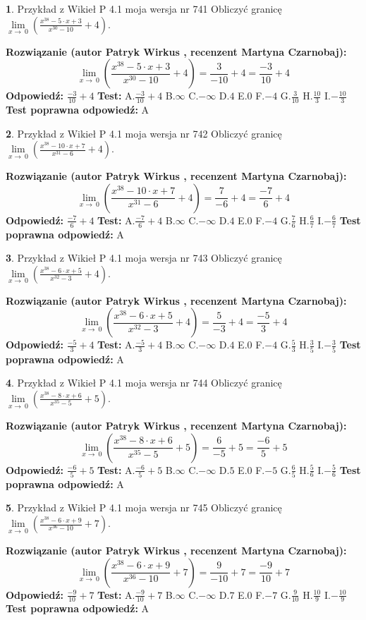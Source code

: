 \documentclass[12pt, a4paper]{article}
\theoremstyle{definition} %
\newtheorem{zad}{}
\newcommand{\zadStart}[1]{\begin{zad}#1\newline}
\newcommand{\zadStop}{\end{zad}}
\newcommand{\rozwStart}[2]{\noindent \textbf{Rozwiązanie (autor #1 , recenzent #2): }\newline}
\newcommand{\rozwStop}{\newline}
\newcommand{\odpStart}{\noindent \textbf{Odpowiedź:}\newline}
\newcommand{\odpStop}{\newline}
\newcommand{\testStart}{\noindent \textbf{Test:}\newline}
\newcommand{\testStop}{\newline}
\newcommand{\kluczStart}{\noindent \textbf{Test poprawna odpowiedź:}\newline}
\newcommand{\kluczStop}{\newline}
\begin{document}
\zadStart{Przykład z Wikieł P 4.1 moja wersja nr 741}
Obliczyć granicę $\lim\limits_{x\to\ 0}(\frac{x^{38}-5 \cdot x +3}{x^{30}-10}+4)$.
\zadStop
\rozwStart{Patryk Wirkus}{Martyna Czarnobaj}
$$\lim\limits_{x\to\ 0}(\frac{x^{38}-5 \cdot x +3}{x^{30}-10}+4)=\frac{3}{-10}+4=\frac{-3}{10}+4$$
\rozwStop
\odpStart
$\frac{-3}{10}+4$
\odpStop
\testStart
A.$\frac{-3}{10}+4$
B.$\infty$
C.$-\infty$
D.$4$
E.$0$
F.$-4$
G.$\frac{3}{10}$
H.$\frac{10}{3}$
I.$-\frac{10}{3}$
\testStop
\kluczStart
A
\kluczStop



\zadStart{Przykład z Wikieł P 4.1 moja wersja nr 742}
Obliczyć granicę $\lim\limits_{x\to\ 0}(\frac{x^{38}-10 \cdot x +7}{x^{31}-6}+4)$.
\zadStop
\rozwStart{Patryk Wirkus}{Martyna Czarnobaj}
$$\lim\limits_{x\to\ 0}(\frac{x^{38}-10 \cdot x +7}{x^{31}-6}+4)=\frac{7}{-6}+4=\frac{-7}{6}+4$$
\rozwStop
\odpStart
$\frac{-7}{6}+4$
\odpStop
\testStart
A.$\frac{-7}{6}+4$
B.$\infty$
C.$-\infty$
D.$4$
E.$0$
F.$-4$
G.$\frac{7}{6}$
H.$\frac{6}{7}$
I.$-\frac{6}{7}$
\testStop
\kluczStart
A
\kluczStop



\zadStart{Przykład z Wikieł P 4.1 moja wersja nr 743}
Obliczyć granicę $\lim\limits_{x\to\ 0}(\frac{x^{38}-6 \cdot x +5}{x^{32}-3}+4)$.
\zadStop
\rozwStart{Patryk Wirkus}{Martyna Czarnobaj}
$$\lim\limits_{x\to\ 0}(\frac{x^{38}-6 \cdot x +5}{x^{32}-3}+4)=\frac{5}{-3}+4=\frac{-5}{3}+4$$
\rozwStop
\odpStart
$\frac{-5}{3}+4$
\odpStop
\testStart
A.$\frac{-5}{3}+4$
B.$\infty$
C.$-\infty$
D.$4$
E.$0$
F.$-4$
G.$\frac{5}{3}$
H.$\frac{3}{5}$
I.$-\frac{3}{5}$
\testStop
\kluczStart
A
\kluczStop



\zadStart{Przykład z Wikieł P 4.1 moja wersja nr 744}
Obliczyć granicę $\lim\limits_{x\to\ 0}(\frac{x^{38}-8 \cdot x +6}{x^{35}-5}+5)$.
\zadStop
\rozwStart{Patryk Wirkus}{Martyna Czarnobaj}
$$\lim\limits_{x\to\ 0}(\frac{x^{38}-8 \cdot x +6}{x^{35}-5}+5)=\frac{6}{-5}+5=\frac{-6}{5}+5$$
\rozwStop
\odpStart
$\frac{-6}{5}+5$
\odpStop
\testStart
A.$\frac{-6}{5}+5$
B.$\infty$
C.$-\infty$
D.$5$
E.$0$
F.$-5$
G.$\frac{6}{5}$
H.$\frac{5}{6}$
I.$-\frac{5}{6}$
\testStop
\kluczStart
A
\kluczStop



\zadStart{Przykład z Wikieł P 4.1 moja wersja nr 745}
Obliczyć granicę $\lim\limits_{x\to\ 0}(\frac{x^{38}-6 \cdot x +9}{x^{36}-10}+7)$.
\zadStop
\rozwStart{Patryk Wirkus}{Martyna Czarnobaj}
$$\lim\limits_{x\to\ 0}(\frac{x^{38}-6 \cdot x +9}{x^{36}-10}+7)=\frac{9}{-10}+7=\frac{-9}{10}+7$$
\rozwStop
\odpStart
$\frac{-9}{10}+7$
\odpStop
\testStart
A.$\frac{-9}{10}+7$
B.$\infty$
C.$-\infty$
D.$7$
E.$0$
F.$-7$
G.$\frac{9}{10}$
H.$\frac{10}{9}$
I.$-\frac{10}{9}$
\testStop
\kluczStart
A
\kluczStop
\end{document}
